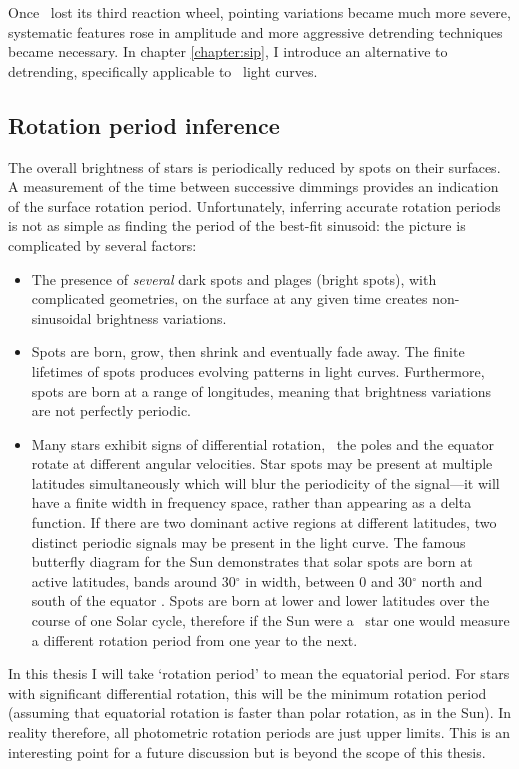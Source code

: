 Once \kepler\ lost its third reaction wheel, pointing variations became much
more severe, systematic features rose in amplitude and more aggressive
detrending techniques became necessary.
In chapter \ref{chapter:sip}, I introduce an alternative to detrending,
specifically applicable to \ktwo\ light curves.

\subsection{Rotation period inference}
\label{sec:rotation}
The overall brightness of stars is periodically reduced by spots on their
surfaces.
A measurement of the time between successive dimmings provides an indication
of the surface rotation period.
Unfortunately, inferring accurate rotation periods is not as simple as finding
the period of the best-fit sinusoid: the picture is complicated by several
factors:
\begin{itemize}
\item{The presence of {\it several} dark spots and plages (bright spots), with
complicated geometries, on the surface at any given time creates
non-sinusoidal brightness variations.}
\item{Spots are born, grow, then shrink and eventually fade away.
The finite lifetimes of spots produces evolving patterns in light curves.
Furthermore, spots are born at a range of longitudes, meaning that brightness
variations are not perfectly periodic.}
\item{Many stars exhibit signs of differential rotation, \ie\ the poles and
the equator rotate at different angular velocities.
Star spots may be present at multiple latitudes simultaneously which will blur
the periodicity of the signal---it will have a finite width in frequency
space, rather than appearing as a delta function.
If there are two dominant active regions at different latitudes, two distinct
periodic signals may be present in the light curve.
The famous butterfly diagram for the Sun demonstrates that solar spots are
born at active latitudes, bands around 30$^\circ$ in width, between 0 and
30$^\circ$ north and south of the equator \citep[\eg][]{Charbonneau2010}.
Spots are born at lower and lower latitudes over the course of one Solar
cycle, therefore if the Sun were a \kepler\
star one would measure a different rotation period from one year to the next.
}
\end{itemize}

In this thesis I will take `rotation period' to mean the equatorial period.
For stars with significant differential rotation, this will be the minimum
rotation period (assuming that equatorial rotation is faster than polar
rotation, as in the Sun).
In reality therefore, all photometric rotation periods are just upper limits.
This is an interesting point for a future discussion but is beyond the scope
of this thesis.


